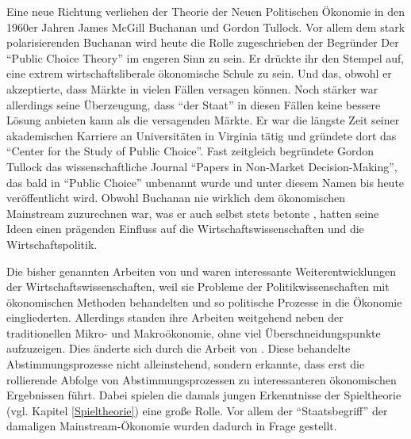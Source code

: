 Eine neue Richtung verliehen der Theorie der Neuen Politischen Ökonomie in den 1960er Jahren James McGill Buchanan und Gordon Tullock. Vor allem dem stark polarisierenden Buchanan wird heute die Rolle zugeschrieben der Begründer Der "`Public Choice Theory"' im engeren Sinn zu sein. Er drückte ihr den Stempel auf, eine extrem wirtschaftsliberale ökonomische Schule zu sein. Und das, obwohl er akzeptierte, dass Märkte in vielen Fällen versagen können. Noch stärker war allerdings seine Überzeugung, dass "`der Staat"' in diesen Fällen keine bessere Lösung anbieten kann als die versagenden Märkte. Er war die längste Zeit seiner akademischen Karriere an Universitäten in Virginia tätig und gründete dort das "`Center for the Study of Public Choice"'. Fast zeitgleich begründete Gordon Tullock das wissenschaftliche Journal "`Papers in Non-Market Decision-Making"', das bald in "`Public Choice"' unbenannt wurde \parencite[S. 101]{Mitchell1988} und unter diesem Namen bis heute veröffentlicht wird. Obwohl Buchanan nie wirklich dem ökonomischen Mainstream zuzurechnen war, was er auch selbst stets betonte \parencite[S. 96]{Warsh}, hatten seine Ideen einen prägenden Einfluss auf die Wirtschaftswissenschaften und die Wirtschaftspolitik. 

Die bisher genannten Arbeiten von \textcite{Black1948a} und \textcite{Downs1957} waren interessante Weiterentwicklungen der Wirtschaftswissenschaften, weil sie Probleme der Politikwissenschaften mit ökonomischen Methoden behandelten und so politische Prozesse in die Ökonomie eingliederten. Allerdings standen ihre Arbeiten weitgehend neben der traditionellen Mikro- und Makroökonomie, ohne viel Überschneidungspunkte aufzuzeigen. Dies änderte sich durch die Arbeit von \textcite{Buchanan1962}. Diese behandelte Abstimmungsprozesse nicht alleinstehend, sondern erkannte, dass erst die rollierende Abfolge von Abstimmungsprozessen zu interessanteren ökonomischen Ergebnissen führt. Dabei spielen die damals jungen Erkenntnisse der Spieltheorie (vgl. Kapitel \ref{Spieltheorie}) eine große Rolle. Vor allem der "`Staatsbegriff"' der damaligen Mainstream-Ökonomie wurden dadurch in Frage gestellt.

